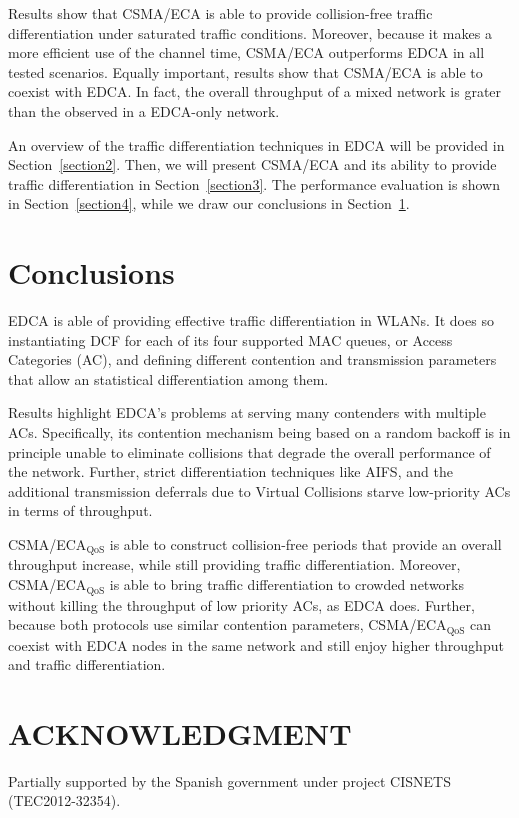 \documentclass[a4paper,journal]{IEEEtran}
\begin{document}
Results show that CSMA/ECA is able to provide collision-free traffic differentiation under saturated traffic conditions. Moreover, because it makes a more efficient use of the channel time, CSMA/ECA outperforms EDCA in all tested scenarios. Equally important, results show that CSMA/ECA is able to coexist with EDCA. In fact, the overall throughput of a mixed network is grater than the observed in a EDCA-only network.

An overview of the traffic differentiation techniques in EDCA will be provided in Section~\ref{section2}. Then, we will present CSMA/ECA and its ability to provide traffic differentiation in Section~\ref{section3}. The performance evaluation is shown in Section~\ref{section4}, while we draw our conclusions in Section~\ref{section5}.





\section{Conclusions}\label{section5}
EDCA is able of providing effective traffic differentiation in WLANs. It does so instantiating DCF for each of its four supported MAC queues, or Access Categories (AC), and defining different contention and transmission parameters that allow an statistical differentiation among them. 

Results highlight EDCA's problems at serving many contenders with multiple ACs. Specifically, its contention mechanism being based on a random backoff is in principle unable to eliminate collisions that degrade the overall performance of the network. Further, strict differentiation techniques like AIFS, and the additional transmission deferrals due to Virtual Collisions starve low-priority ACs in terms of throughput.

CSMA/ECA$_{\text{QoS}}$ is able to construct collision-free periods that provide an overall throughput increase, while still providing traffic differentiation. Moreover, CSMA/ECA$_{\text{QoS}}$ is able to bring traffic differentiation to crowded networks without killing the throughput of low priority ACs, as EDCA does. Further, because both protocols use similar contention parameters, CSMA/ECA$_{\text{QoS}}$ can coexist with EDCA nodes in the same network and still enjoy higher throughput and traffic differentiation.

\section*{ACKNOWLEDGMENT}
Partially supported by the Spanish government under project CISNETS (TEC2012-32354).



\end{document}
